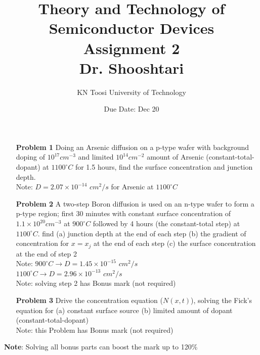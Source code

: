 \documentclass{report}
\title{Theory and Technology of Semiconductor Devices\\ Assignment 2 \\ \vspace{30pt} Dr. Shooshtari}
\author{KN Toosi University of Technology}
\date{Due Date: Dec 20}
\begin{document}
	\maketitle
	
	\begin{enumerate}
		\item[\bf{Problem 1}] Doing an Arsenic diffusion on a p-type wafer with background doping of $10^{17} cm^{-3}$ and limited $10^{14} cm^{-2}$ amount of Arsenic (constant-total-dopant) at $1100^{\circ} C$ for 1.5 hours, find the surface concentration and junction depth. \\
		Note: $D=2.07\times 10^{-14}$ $cm^2/s$ for Arsenic at $1100^{\circ} C$
		
		\item[\bf{Problem 2}] A two-step Boron diffusion is used on an n-type wafer to form a p-type region; first 30 minutes with constant surface concentration of $1.1\times 10^{20} cm^{-3}$ at $900^{\circ} C$ followed by 4 hours (the constant-total step) at $1100^{\circ} C$. find (a) junction depth at the end of each step (b) the gradient of concentration for $x=x_j$ at the end of each step (c) the surface concentration at the end of step 2\\
		Note: $900^{\circ} C \rightarrow D = 1.45\times 10^{-15}$ $cm^{2}/s$ \\
		$1100^{\circ} C \rightarrow D = 2.96\times 10^{-13}$ $cm^{2}/s$ \\
		Note: solving step 2 has Bonus mark (not required)
		
		\item[\bf{Problem 3}] Drive the concentration equation ($N(x,t)$), solving the Fick's equation for (a) constant surface source (b) limited amount of dopant (constant-total-dopant) \\
		Note: this Problem has Bonus mark (not required)
	\end{enumerate}
	\vspace{120pt}
	\hspace{-35pt} \textbf{Note}: Solving all bonus parts can boost the mark up to 120\% 
\end{document}
